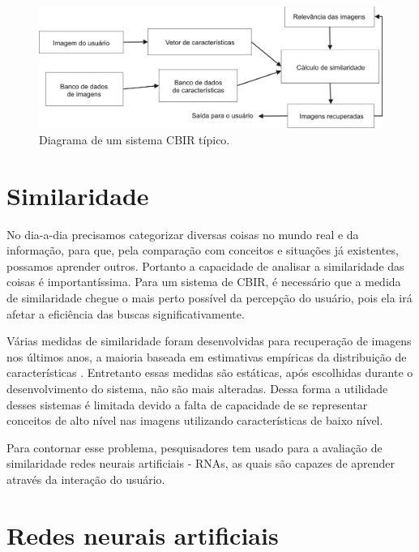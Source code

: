 \begin{figure}[ht]
 \begin{center}
  \includegraphics[width=6in]{imagens/CBIR.png}
 \end{center}
 \caption{Diagrama de um sistema CBIR típico.}
 \label{fig:cbir}
\end{figure}

\section{Similaridade}

No dia-a-dia precisamos categorizar diversas coisas no mundo real e da informação, para que, pela comparação com conceitos e situações já existentes, possamos aprender outros. Portanto a capacidade de analisar a similaridade das coisas é importantíssima. Para um sistema de CBIR, é necessário que a medida de similaridade chegue o mais perto possível da percepção do usuário, pois ela irá afetar a eficiência das buscas significativamente.

Várias medidas de similaridade foram desenvolvidas para recuperação de imagens nos últimos anos, a maioria baseada em estimativas empíricas da distribuição de características \cite{feng-chapter}. Entretanto essas medidas são estáticas, após escolhidas durante o desenvolvimento do sistema, não são mais alteradas. Dessa forma a utilidade desses sistemas é limitada devido a falta de capacidade de se representar conceitos de alto nível nas imagens utilizando características de baixo nível.

Para contornar esse problema, pesquisadores \cite{mammography} \cite{cbir-nn-general} tem usado para a avaliação de similaridade redes neurais artificiais - RNAs, as quais são capazes de aprender através da interação do usuário.

\section{Redes neurais artificiais}

